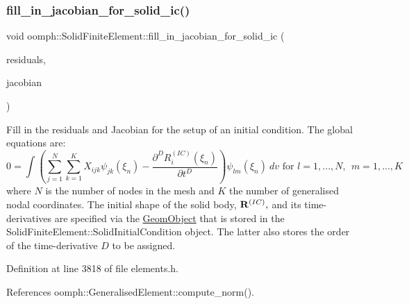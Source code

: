 \mbox{\label{classoomph_1_1SolidFiniteElement_ab05ee82d79d87f92c5aec3156231ac2d}} 
\subsubsection{\texorpdfstring{fill\+\_\+in\+\_\+jacobian\+\_\+for\+\_\+solid\+\_\+ic()}{fill\_in\_jacobian\_for\_solid\_ic()}}
{\footnotesize\ttfamily void oomph\+::\+Solid\+Finite\+Element\+::fill\+\_\+in\+\_\+jacobian\+\_\+for\+\_\+solid\+\_\+ic (\begin{DoxyParamCaption}\item[{\hyperlink{classoomph_1_1Vector}{Vector}$<$ double $>$ \&}]{residuals,  }\item[{\hyperlink{classoomph_1_1DenseMatrix}{Dense\+Matrix}$<$ double $>$ \&}]{jacobian }\end{DoxyParamCaption})\hspace{0.3cm}{\ttfamily [inline]}}



Fill in the residuals and Jacobian for the setup of an initial condition. The global equations are\+: \[ 0 = \int \left( \sum_{j=1}^N \sum_{k=1}^K X_{ijk} \psi_{jk}(\xi_n) - \frac{\partial^D R^{(IC)}_i(\xi_n)}{\partial t^D} \right) \psi_{lm}(\xi_n) \ dv \mbox{ \ \ \ \ for \ \ \ $l=1,...,N, \ \ m=1,...,K$} \] where $ N $ is the number of nodes in the mesh and $ K $ the number of generalised nodal coordinates. The initial shape of the solid body, $ {\bf R}^{(IC)},$ and its time-\/derivatives are specified via the {\ttfamily \hyperlink{classoomph_1_1GeomObject}{Geom\+Object}} that is stored in the {\ttfamily Solid\+Finite\+Element\+::\+Solid\+Initial\+Condition} object. The latter also stores the order of the time-\/derivative $ D $ to be assigned. 



Definition at line 3818 of file elements.\+h.



References oomph\+::\+Generalised\+Element\+::compute\+\_\+norm().



